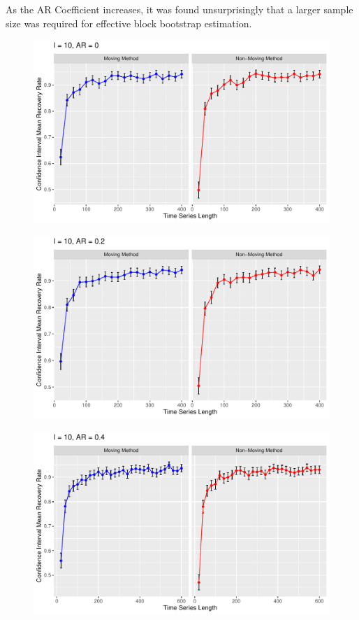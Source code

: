 \documentclass[12pt, letterpaper, titlepage]{article}
\begin{document}
As the AR Coefficient increases, it was found unsurprisingly that a larger sample size was 
required for effective block bootstrap estimation. 

\begin{figure}[tbp]
  \centering
  \includegraphics[width=\textwidth]{constant_0}
  \caption{}
  \label{fig:constant_0}
\end{figure}

\begin{figure}[tbp]
  \centering
  \includegraphics[width=\textwidth]{constant_0.2}
  \caption{}
  \label{fig:constant_0.2}
\end{figure}

\begin{figure}[tbp]
  \centering
  \includegraphics[width=\textwidth]{constant_0.4}
  \caption{}
  \label{fig:constant_0.4}
\end{figure}
\end{document}
